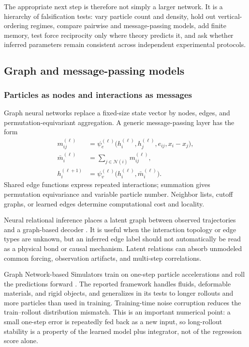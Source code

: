 The appropriate next step is therefore not simply a larger network. It is a hierarchy of falsification tests: vary particle count and density, hold out vertical-ordering regimes, compare pairwise and message-passing models, add finite memory, test force reciprocity only where theory predicts it, and ask whether inferred parameters remain consistent across independent experimental protocols.

\subsection{Graph and message-passing models}

\subsubsection{Particles as nodes and interactions as messages}

Graph neural networks replace a fixed-size state vector by nodes, edges, and permutation-equivariant aggregation. A generic message-passing layer has the form
\begin{align}
m_{ij}^{(\ell)}
&=
\psi_e^{(\ell)}
\bigl(h_i^{(\ell)},h_j^{(\ell)},e_{ij},x_i-x_j\bigr),\\
\bar m_i^{(\ell)}
&=
\sum_{j\in\mathcal N(i)}m_{ij}^{(\ell)},\\
h_i^{(\ell+1)}
&=
\psi_v^{(\ell)}
\bigl(h_i^{(\ell)},\bar m_i^{(\ell)}\bigr).
\end{align}
Shared edge functions express repeated interactions; summation gives permutation equivariance and variable particle number. Neighbor lists, cutoff graphs, or learned edges determine computational cost and locality.

Neural relational inference places a latent graph between observed trajectories and a graph-based decoder \citep{kipf2018nri}. It is useful when the interaction topology or edge types are unknown, but an inferred edge label should not automatically be read as a physical bond or causal mechanism. Latent relations can absorb unmodeled common forcing, observation artifacts, and multi-step correlations.

Graph Network-based Simulators train on one-step particle accelerations and roll the predictions forward \citep{sanchezgonzalez2020gns}. The reported framework handles fluids, deformable materials, and rigid objects, and generalizes in its tests to longer rollouts and more particles than used in training. Training-time noise corruption reduces the train--rollout distribution mismatch. This is an important numerical point: a small one-step error is repeatedly fed back as a new input, so long-rollout stability is a property of the learned model plus integrator, not of the regression score alone.

